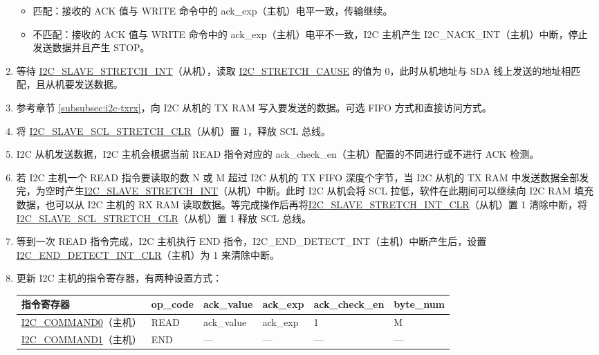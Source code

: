 \documentclass[main\_\_CN.tex]{subfiles}
\begin{document}
\begin{enumerate}
\begin{itemize}
\item 匹配：接收的 ACK 值与 WRITE 命令中的 ack\_exp（主机）电平一致，传输继续。
\item 不匹配：接收的 ACK 值与 WRITE 命令中的 ack\_exp（主机）电平不一致，I2C 主机产生 I2C\_NACK\_INT（主机）中断，停止发送数据并且产生 STOP。
\end{itemize}

\item 等待 \hyperref[int:i2c-slave-stretch]{I2C\_SLAVE\_STRETCH\_INT}（从机），读取 \hyperref[fielddesc:I2CSTRETCHCAUSE]{I2C\_STRETCH\_CAUSE} 的值为 0，此时从机地址与 SDA 线上发送的地址相匹配，且从机要发送数据。
\item 参考章节 \ref{subsubsec:i2c-txrx}，向 I2C 从机的 TX RAM 写入要发送的数据。可选 FIFO 方式和直接访问方式。
\item 将 \hyperref[fielddesc:I2CSLAVESCLSTRETCHCLR]{I2C\_SLAVE\_SCL\_STRETCH\_CLR}（从机）置 1，释放 SCL 总线。
\item I2C 从机发送数据，I2C 主机会根据当前 READ 指令对应的 ack\_check\_en（主机）配置的不同进行或不进行 ACK 检测。
\item 若 I2C 主机一个 READ 指令要读取的数 N 或 M 超过 I2C 从机的 TX FIFO 深度个字节，当 I2C 从机的 TX RAM 中发送数据全部发完，为空时产生\hyperref[int:i2c-slave-stretch]{I2C\_SLAVE\_STRETCH\_INT}（从机）中断。此时 I2C 从机会将 SCL 拉低，软件在此期间可以继续向 I2C RAM 填充数据，也可以从 I2C 主机的 RX RAM 读取数据。等完成操作后再将\hyperref[fielddesc:I2CSLAVESTRETCHINTCLR]{I2C\_SLAVE\_STRETCH\_INT\_CLR}（从机）置 1 清除中断，将 \hyperref[fielddesc:I2CSLAVESCLSTRETCHCLR]{I2C\_SLAVE\_SCL\_STRETCH\_CLR}（从机）置 1 释放 SCL 总线。
\item 等到一次 READ 指令完成，I2C 主机执行 END 指令，I2C\_END\_DETECT\_INT（主机）中断产生后，设置 \hyperref[fielddesc:I2CENDDETECTINTCLR]{I2C\_END\_DETECT\_INT\_CLR}（主机）为 1 来清除中断。
\newpage
\item 更新 I2C 主机的指令寄存器，有两种设置方式：

\begin{longtable}{ | p{4cm} | p{2cm} | p{2cm} | p{2cm} |p{2cm} | p{2cm} |}
\hline\rowcolor{lightgray}
指令寄存器& op\_code & ack\_value&ack\_exp&ack\_check\_en&byte\_num  \\ \hline
\hyperref[fielddesc:I2CCOMMAND0]{I2C\_COMMAND0}（主机）& READ& ack\_value&ack\_exp&1&M  \\ \hline
\hyperref[fielddesc:I2CCOMMAND1]{I2C\_COMMAND1}（主机）& END& ---&---&---&---  \\ \hline
\end{longtable}


\end{enumerate}
\end{document}
